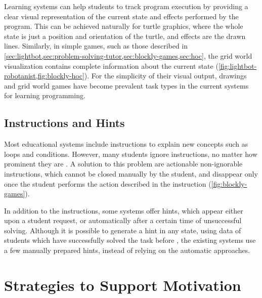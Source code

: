Learning systems can help students to track program execution
  by providing a clear visual representation of the current state
  and effects performed by the program.
This can be achieved naturally for turtle graphics,
  where the whole state is just a position and orientation of the turtle,
  and effects are the drawn lines.
Similarly, in simple games, such as those described in
  \cref{sec:lightbot,sec:problem-solving-tutor,sec:blockly-games,sec:hoc},
  the grid world visualization contains complete information about the current
  state (\cref{fig:lightbot-robotanist,fig:blockly-hoc}).
For the simplicity of their visual output,
  drawings and grid world games have become prevalent task types
  in the current systems for learning programming.

\subsection{Instructions and Hints}
\label{sec:instructions-and-hints}

Most educational systems include instructions
  to explain new concepts such as loops and conditions.
However, many students ignore instructions,
  no matter how prominent they are \cite{blockly-10-things}.
A solution to this problem are actionable non-ignorable instructions,
  which cannot be closed manually by the student, and disappear only once the
  student performs the action described in the instruction
  (\cref{fig:blockly-games}).

In addition to the instructions, some systems offer hints, which appear either
  upon a student request, or automatically after a certain time of unsuccessful
  solving. Although it is possible to generate a hint in any state,
  using data of students which have successfully solved the task before
  \cite{generating-hints}, the existing systems use a few manually prepared
  hints, instead of relying on the automatic approaches.

\section{Strategies to Support Motivation}
\label{sec:motivation}

